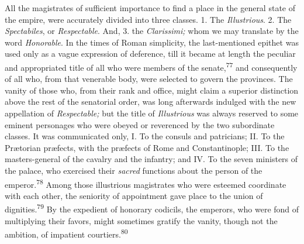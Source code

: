 



All the magistrates of sufficient importance to find a place in
the general state of the empire, were accurately divided into
three classes. 1. The \textit{Illustrious}. 2. The \textit{Spectabiles}, or
\textit{Respectable}. And, 3. the \textit{Clarissimi;} whom we may translate by
the word \textit{Honorable}. In the times of Roman simplicity, the
last-mentioned epithet was used only as a vague expression of
deference, till it became at length the peculiar and appropriated
title of all who were members of the senate,\textsuperscript{77} and consequently
of all who, from that venerable body, were selected to govern the
provinces. The vanity of those who, from their rank and office,
might claim a superior distinction above the rest of the
senatorial order, was long afterwards indulged with the new
appellation of \textit{Respectable;} but the title of \textit{Illustrious} was
always reserved to some eminent personages who were obeyed or
reverenced by the two subordinate classes. It was communicated
only, I. To the consuls and patricians; II. To the Prætorian
præfects, with the præfects of Rome and Constantinople; III. To
the masters-general of the cavalry and the infantry; and IV. To
the seven ministers of the palace, who exercised their \textit{sacred}
functions about the person of the emperor.\textsuperscript{78} Among those
illustrious magistrates who were esteemed coordinate with each
other, the seniority of appointment gave place to the union of
dignities.\textsuperscript{79} By the expedient of honorary codicils, the
emperors, who were fond of multiplying their favors, might
sometimes gratify the vanity, though not the ambition, of
impatient courtiers.\textsuperscript{80}

